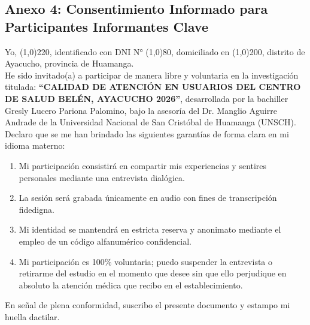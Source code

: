 \vspace{0.5cm}

\subsection*{Anexo 4: Consentimiento Informado para Participantes Informantes Clave}
\label{anx:4_consentimiento}

\noindent Yo, \line(1,0){220}, identificado con DNI N° \line(1,0){80}, domiciliado en \line(1,0){200}, distrito de Ayacucho, provincia de Huamanga.\\

\noindent He sido invitado(a) a participar de manera libre y voluntaria en la investigación titulada: \textbf{``CALIDAD DE ATENCIÓN EN USUARIOS DEL CENTRO DE SALUD BELÉN, AYACUCHO 2026''}, desarrollada por la bachiller Gresly Lucero Pariona Palomino, bajo la asesoría del Dr. Manglio Aguirre Andrade de la Universidad Nacional de San Cristóbal de Huamanga (UNSCH).\\

\noindent Declaro que se me han brindado las siguientes garantías de forma clara en mi idioma materno:
\begin{enumerate}
    \item Mi participación consistirá en compartir mis experiencias y sentires personales mediante una entrevista dialógica.
    \item La sesión será grabada únicamente en audio con fines de transcripción fidedigna.
    \item Mi identidad se mantendrá en estricta reserva y anonimato mediante el empleo de un código alfanumérico confidencial.
    \item Mi participación es 100\% voluntaria; puedo suspender la entrevista o retirarme del estudio en el momento que desee sin que ello perjudique en absoluto la atención médica que recibo en el establecimiento.
\end{enumerate}

\noindent En señal de plena conformidad, suscribo el presente documento y estampo mi huella dactilar.\\

